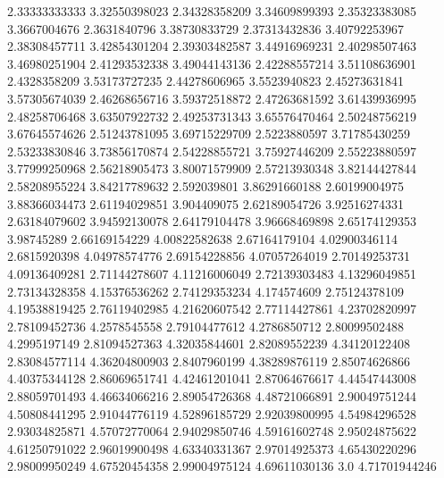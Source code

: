   2.33333333333    3.32550398023
  2.34328358209    3.34609899393
  2.35323383085     3.3667004676
   2.3631840796    3.38730833729
  2.37313432836    3.40792253967
  2.38308457711    3.42854301204
  2.39303482587    3.44916969231
  2.40298507463    3.46980251904
  2.41293532338    3.49044143136
  2.42288557214    3.51108636901
   2.4328358209    3.53173727235
  2.44278606965     3.5523940823
  2.45273631841    3.57305674039
  2.46268656716    3.59372518872
  2.47263681592    3.61439936995
  2.48258706468    3.63507922732
  2.49253731343    3.65576470464
  2.50248756219    3.67645574626
  2.51243781095    3.69715229709
   2.5223880597    3.71785430259
  2.53233830846    3.73856170874
  2.54228855721    3.75927446209
  2.55223880597    3.77999250968
  2.56218905473    3.80071579909
  2.57213930348    3.82144427844
  2.58208955224    3.84217789632
    2.592039801    3.86291660188
  2.60199004975    3.88366034473
  2.61194029851      3.904409075
  2.62189054726    3.92516274331
  2.63184079602    3.94592130078
  2.64179104478    3.96668469898
  2.65174129353       3.98745289
  2.66169154229    4.00822582638
  2.67164179104    4.02900346114
   2.6815920398    4.04978574776
  2.69154228856    4.07057264019
  2.70149253731    4.09136409281
  2.71144278607    4.11216006049
  2.72139303483    4.13296049851
  2.73134328358    4.15376536262
  2.74129353234      4.174574609
  2.75124378109    4.19538819425
  2.76119402985    4.21620607542
  2.77114427861    4.23702820997
  2.78109452736     4.2578545558
  2.79104477612     4.2786850712
  2.80099502488     4.2995197149
  2.81094527363    4.32035844601
  2.82089552239    4.34120122408
  2.83084577114    4.36204800903
   2.8407960199    4.38289876119
  2.85074626866    4.40375344128
  2.86069651741    4.42461201041
  2.87064676617    4.44547443008
  2.88059701493    4.46634066216
  2.89054726368    4.48721066891
  2.90049751244    4.50808441295
  2.91044776119    4.52896185729
  2.92039800995    4.54984296528
  2.93034825871    4.57072770064
  2.94029850746    4.59161602748
  2.95024875622    4.61250791022
  2.96019900498    4.63340331367
  2.97014925373    4.65430220296
  2.98009950249    4.67520454358
  2.99004975124    4.69611030136
            3.0    4.71701944246

